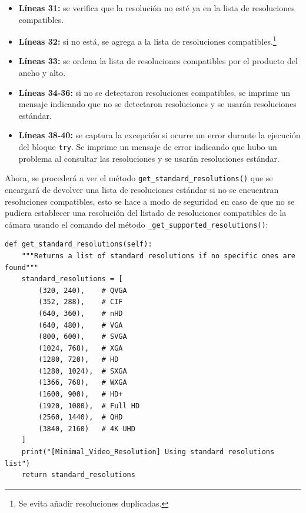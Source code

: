 \begin{itemize}
    \item \textbf{Líneas 31:} se verifica que la resolución no esté ya en la lista de resoluciones compatibles. 
    \item \textbf{Líneas 32:} si no está, se agrega a la lista de resoluciones compatibles.\footnote{Se evita añadir resoluciones duplicadas.}
    \item \textbf{Líneas 33:} se ordena la lista de resoluciones compatibles por el producto del ancho y alto.
    \item \textbf{Líneas 34-36:} si no se detectaron resoluciones compatibles, se imprime un mensaje indicando que no se detectaron resoluciones y se usarán resoluciones estándar.
    \item \textbf{Líneas 38-40:} se captura la excepción si ocurre un error durante la ejecución del bloque \texttt{try}. Se imprime un mensaje de error indicando que hubo un problema al consultar las resoluciones y se usarán resoluciones estándar.
\end{itemize}
\vspace{\baselineskip}

Ahora, se procederá a ver el método \texttt{get\_standard\_resolutions()} que se encargará de devolver una lista de resoluciones estándar si no se encuentran resoluciones compatibles, esto se hace a modo de seguridad en caso de que no se pudiera establecer una resolución del listado de resoluciones compatibles de la cámara usando el comando del método \texttt{\_get\_supported\_resolutions()}:
\begin{lstlisting}[style=pythonstyle, caption={Método \texttt{get\_standard\_resolutions()} de \textit{Minimal\_Video\_Resolution}.}, label={lst:get_standard_resolutions_minimal_video_resolution}]
def get_standard_resolutions(self):
    """Returns a list of standard resolutions if no specific ones are found"""
    standard_resolutions = [
        (320, 240),    # QVGA
        (352, 288),    # CIF
        (640, 360),    # nHD
        (640, 480),    # VGA
        (800, 600),    # SVGA
        (1024, 768),   # XGA
        (1280, 720),   # HD
        (1280, 1024),  # SXGA
        (1366, 768),   # WXGA
        (1600, 900),   # HD+
        (1920, 1080),  # Full HD
        (2560, 1440),  # QHD
        (3840, 2160)   # 4K UHD
    ]
    print("[Minimal_Video_Resolution] Using standard resolutions list")
    return standard_resolutions
\end{lstlisting}
\vspace{\baselineskip}

